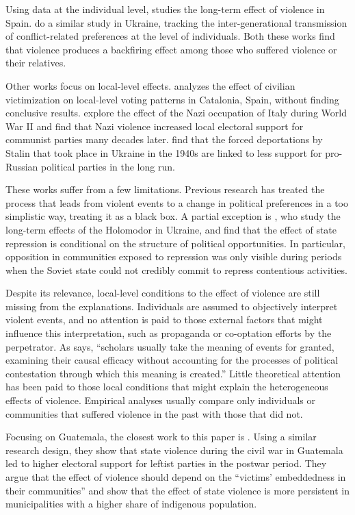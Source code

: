\documentclass[12pt, notitlepage]{article}
\begin{document}
Using data at the individual level, \citet{Balcells:2012aa} studies the long-term effect of violence in Spain.
\citet{Lupu:2017aa} do a similar study in Ukraine, tracking the inter-generational transmission of conflict-related preferences at the level of individuals.
Both these works find that violence produces a backfiring effect among those who suffered violence or their relatives.

Other works focus on local-level effects.
\citet{Balcells:2010ab} analyzes the effect of civilian victimization on local-level voting patterns in Catalonia, Spain, without finding conclusive results.
\citet{Fontana:2017aa} explore the effect of the Nazi occupation of Italy during World War II and find that Nazi violence increased local electoral support for communist parties many decades later.
\citet{Rozenas:2017aa} find that the forced deportations by Stalin that took place in Ukraine in the 1940s are linked to less support for pro-Russian political parties in the long run.

These works suffer from a few limitations.
Previous research has treated the process that leads from violent events to a change in political preferences in a too simplistic way, treating it as a black box.
A partial exception is \citet{Rozenas:2019aa}, who study the long-term effects of the Holomodor in Ukraine, and find that the effect of state repression is conditional on the structure of political opportunities.
In particular, opposition in communities exposed to repression was only visible during periods when the Soviet state could not credibly commit to repress contentious activities.

Despite its relevance, local-level conditions to the effect of violence are still missing from the explanations.
Individuals are assumed to objectively interpret violent events, and no attention is paid to those external factors that might influence this interpretation, such as propaganda or co-optation efforts by the perpetrator.
As \citet[1244]{Basta:2018aa} says, ``scholars usually take the meaning of events for granted, examining their causal efficacy without accounting for the processes of political contestation through which this meaning is created.''
Little theoretical attention has been paid to those local conditions that might explain the heterogeneous effects of violence.
Empirical analyses usually compare only individuals or communities that suffered violence in the past with those that did not.

Focusing on Guatemala, the closest work to this paper is \citet{Vogt:2019aa}.
Using a similar research design, they show that state violence during the civil war in Guatemala led to higher electoral support for leftist parties in the postwar period.
They argue that the effect of violence should depend on the ``victims' embeddedness in their communities'' and show that the effect of state violence is more persistent in municipalities with a higher share of indigenous population.
\end{document}
